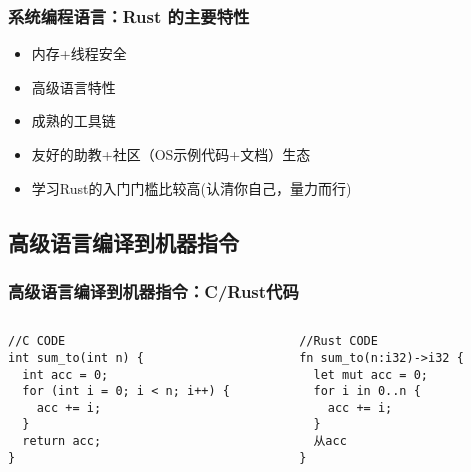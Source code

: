 \begin{frame}
	\frametitle{系统编程语言：\small{Rust 的主要特性}}
	
		
		\begin{itemize}
			\item 内存+线程安全
			\item 高级语言特性
			\item 成熟的工具链
			\item 友好的助教+社区（OS示例代码+文档）生态
			\item 学习Rust的入门门槛比较高(认清你自己，量力而行)
		\end{itemize}
		
	
\end{frame}


\subsection{高级语言编译到机器指令} %



\begin{frame}[fragile]
	\frametitle{高级语言编译到机器指令：\small{C/Rust代码}}

	\begin{columns}[t]
	\begin{column}{.45\linewidth}
		
\begin{block}{}
\begin{verbatim}
//C CODE
int sum_to(int n) {
  int acc = 0;
  for (int i = 0; i < n; i++) {
    acc += i;
  }
  return acc;
}
\end{verbatim}
\end{block}
\end{column}

\begin{column}{.45\linewidth}
\begin{block}{}
\begin{verbatim}
//Rust CODE
fn sum_to(n:i32)->i32 {
  let mut acc = 0;
  for i in 0..n {
    acc += i;
  }
  从acc
}
\end{verbatim}
\end{block}
\end{column}
\end{columns}
	
\end{frame}





